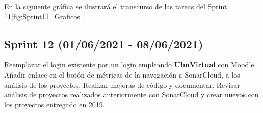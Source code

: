 En la siguiente gráfica se ilustrará el transcurso de las tareas del Sprint 11\ref{fig:Sprint11_Graficos}.



\subsection{Sprint 12 (01/06/2021 - 08/06/2021)}
Reemplazar el login existente por un login empleando \textbf{UbuVirtual} con Moodle. Añadir enlace en el botón de métricas de la navegación a SonarCloud, a los análisis de los proyectos. Realizar mejoras de código y documentar. Revisar análisis de proyectos realizados anteriormente con SonarCloud y crear nuevos con los proyectos entregado en 2019.

